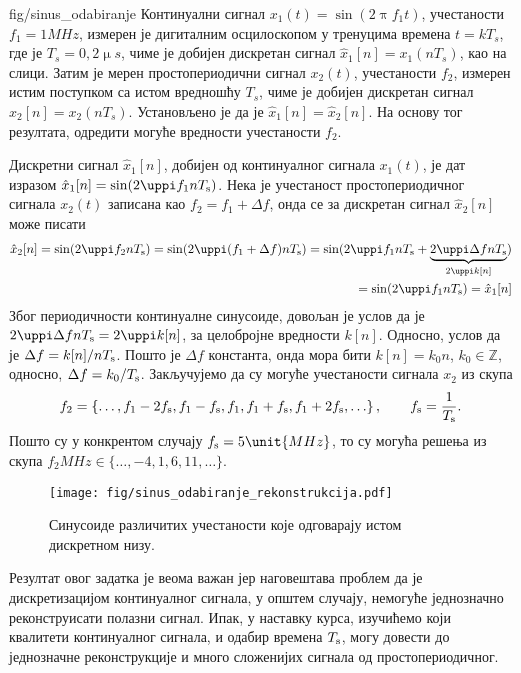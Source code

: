 \noindent\mnImportant
\begin{slikaDesno}{fig/sinus_odabiranje}
    \PID Континуални сигнал $x_1(t) = \sin(2\uppi f_1 t)$, учестаности $f_1 = 1\unit{MHz}$, измерен је 
    дигиталним осцилоскопом у тренуцима времена
    $t = kT_s$, где је ${T_s = 0,2\unit{\upmu s}}$, чиме је добијен дискретан сигнал $\hat x_1[n] = x_1(nT_s)$, као на слици.
    Затим је мерен простопериодични сигнал $x_2(t)$, учестаности $f_2$, измерен истим поступком 
    са истом вредношћу $T_s$, чиме је добијен дискретан сигнал $\hat x_2[n] = x_2(nT_s)$. 
    Установљено је да је $\hat x_1[n] = \hat x_2[n]$. 
    На основу тог резултата, одредити могуће вредности учестаности $f_2$.
\end{slikaDesno}

\RESENJE 
Дискретни сигнал $\hat x_1[n]$, добијен од континуалног сигнала $x_1(t)$, је дат изразом 
$
\hat x_1[n] = \sin(2\uppi f_1 n T_{\rm s}) 
$. Нека је учестаност простопериодичног сигнала $x_2(t)$ записана као $f_2 = f_1 + \Delta f$, онда се за дискретан сигнал 
$\hat x_2[n]$ може писати
\begin{eqnarray}
    \hat x_2[n] = \sin(2\uppi f_2 nT_{\rm s}) = \sin(2\uppi (f_1 + \Delta f) nT_{\rm s}) 
    = \sin(2\uppi f_1 n T_{\rm s} + \underbrace{2\uppi \Delta f n T_{\rm s}}_{2\uppi k[n]}  ) \\
    = \sin(2\uppi f_1 n T_{\rm s}) = \hat x_1[n]
\end{eqnarray}
Због периодичности континуалне синусоиде, довољан је услов да је $2\uppi \Delta f n T_{\rm s} = 2\uppi k[n]$, за целобројне вредности $k[n]$.
Односно, услов да је $\Delta f = k[n]/nT_{\rm s}$. Пошто је $\Delta f$ константа, онда мора бити $k[n] = k_0 n$, 
$k_0 \in \mathbb Z$, односно, $\Delta f = k_0/T_{\rm s}$. Закључујемо да су  могуће учестаности сигнала $x_2$
из скупа
\begin{eqnarray}
    f_2 = \left\{
    \ldots,
    f_1 - 2 f_{\rm s},
    f_1 - f_{\rm s},
    f_1,
    f_1 + f_{\rm s},
    f_1 + 2 f_{\rm s},
    \ldots
    \right\}, \qquad f_{\rm s} = \dfrac{1}{T_{\rm s}}.
\end{eqnarray}
Пошто су у конкрентом случају $f_{\rm s} = 5\unit{MHz}$, то су могућа решења из скупа
$f_2\unit{MHz} \in \{\ldots, -4 ,1, 6, 11, \ldots\}$.

\begin{figure}[ht!]
    \texttt{[image: fig/sinus\_odabiranje\_rekonstrukcija.pdf]}
    \caption{Синусоиде различитих учестаности које одговарају истом дискретном низу.}
\end{figure}

Резултат овог задатка је веома важан јер наговештава проблем да је дискретизацијом 
континуалног сигнала, у општем случају, 
немогуће једнозначно реконструисати полазни сигнал. Ипак, у наставку курса, изучићемо који квалитети 
континуалног сигнала, и одабир времена $T_{\rm s}$, могу довести до једнозначне реконструкције
и много сложенијих сигнала од простопериодичног.  